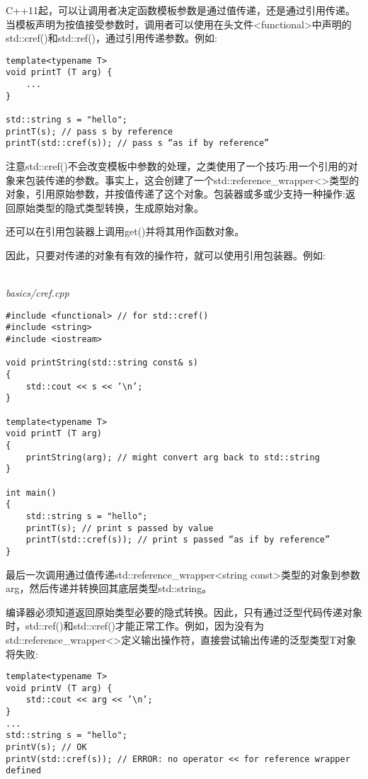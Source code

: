 C++11起，可以让调用者决定函数模板参数是通过值传递，还是通过引用传递。当模板声明为按值接受参数时，调用者可以使用在头文件<functional>中声明的std::cref()和std::ref()，通过引用传递参数。例如:

\begin{lstlisting}[style=styleCXX]
template<typename T>
void printT (T arg) {
	...
}

std::string s = "hello";
printT(s); // pass s by reference
printT(std::cref(s)); // pass s “as if by reference”
\end{lstlisting}

注意std::cref()不会改变模板中参数的处理，之类使用了一个技巧:用一个引用的对象来包装传递的参数。事实上，这会创建了一个std::reference\_wrapper<>类型的对象，引用原始参数，并按值传递了这个对象。包装器或多或少支持一种操作:返回原始类型的隐式类型转换，生成原始对象。

\begin{tcolorbox}[colback=webgreen!5!white,colframe=webgreen!75!black]
\hspace*{0.75cm}还可以在引用包装器上调用get()并将其用作函数对象。
\end{tcolorbox}

因此，只要对传递的对象有有效的操作符，就可以使用引用包装器。例如:

\hspace*{\fill} \\ %
\noindent
\textit{basics/cref.cpp}
\begin{lstlisting}[style=styleCXX]
#include <functional> // for std::cref()
#include <string>
#include <iostream>

void printString(std::string const& s)
{
	std::cout << s << ’\n’;
}

template<typename T>
void printT (T arg)
{
	printString(arg); // might convert arg back to std::string
}

int main()
{
	std::string s = "hello";
	printT(s); // print s passed by value
	printT(std::cref(s)); // print s passed “as if by reference”
}
\end{lstlisting}

最后一次调用通过值传递std::reference\_wrapper<string const>类型的对象到参数arg，然后传递并转换回其底层类型std::string。

编译器必须知道返回原始类型必要的隐式转换。因此，只有通过泛型代码传递对象时，std::ref()和std::cref()才能正常工作。例如，因为没有为std::reference\_wrapper<>定义输出操作符，直接尝试输出传递的泛型类型T对象将失败:

\begin{lstlisting}[style=styleCXX]
template<typename T>
void printV (T arg) {
	std::cout << arg << ’\n’;
}
...
std::string s = "hello";
printV(s); // OK
printV(std::cref(s)); // ERROR: no operator << for reference wrapper defined
\end{lstlisting}

